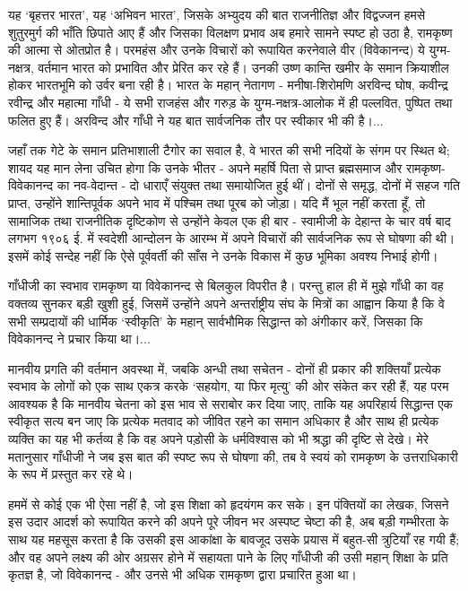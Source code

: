 यह ‘बृहत्तर भारत’, यह ‘अभिवन भारत’, जिसके अभ्युदय की बात राजनीतिज्ञ और विद्वज्जन हमसे शुतुरमुर्ग की भाँति छिपाते आए हैं और जिसका विलक्षण प्रभाव अब हमारे सामने स्पष्ट हो उठा है, रामकृष्ण की आत्मा से ओतप्रोत है। परमहंस और उनके विचारों को रूपायित करनेवाले वीर (विवेकानन्द) ये युग्म-नक्षत्र, वर्तमान भारत को प्रभावित और प्रेरित कर रहे हैं। उनकी उष्ण कान्ति खमीर के समान क्रियाशील होकर भारतभूमि को उर्वर बना रही है। भारत के महान् नेतागण - मनीषा-शिरोमणि अरविन्द घोष, कवीन्द्र रवीन्द्र और महात्मा गाँधी - ये सभी राजहंस और गरुड़ के युग्म-नक्षत्र-आलोक में ही पल्लवित, पुष्पित तथा फलित हुए हैं। अरविन्द और गाँधी ने यह बात सार्वजनिक तौर पर स्वीकार भी की है।... 

जहाँ तक गेटे के समान प्रतिभाशाली टैगोर का सवाल है, वे भारत की सभी नदियों के संगम पर स्थित थे; शायद यह मान लेना उचित होगा कि उनके भीतर - अपने महर्षि पिता से प्राप्त ब्रह्मसमाज और रामकृष्ण-विवेकानन्द का नव-वेदान्त - दो धाराएँ संयुक्त तथा समायोजित हुई थीं। दोनों से समृद्ध, दोनों में सहज गति प्राप्त, उन्होंने शान्तिपूर्वक अपने भाव में पश्चिम तथा पूरब को जोड़ा। यदि मैं भूल नहीं करता हूँ, तो सामाजिक तथा राजनीतिक दृष्टिकोण से उन्होंने केवल एक ही बार - स्वामीजी के देहान्त के चार वर्ष बाद लगभग १९०६ ई. में स्वदेशी आन्दोलन के आरम्भ में अपने विचारों की सार्वजनिक रूप से घोषणा की थी। इसमें कोई सन्देह नहीं कि ऐसे पूर्ववर्ती की साँस ने उनके विकास में कुछ भूमिका अवश्य निभाई होगी। 

\delimiter

गाँधीजी का स्वभाव रामकृष्ण या विवेकानन्द से बिलकुल विपरीत है। परन्तु हाल ही में मुझे गाँधी का वह वक्तव्य सुनकर बड़ी खुशी हुई, जिसमें उन्होंने अपने अन्तर्राष्ट्रीय संघ के मित्रों का आह्वान किया है कि वे सभी सम्प्रदायों की धार्मिक ‘स्वीकृति’ के महान् सार्वभौमिक सिद्धान्त को अंगीकार करें, जिसका कि विवेकानन्द ने प्रचार किया था।... 

मानवीय प्रगति की वर्तमान अवस्था में, जबकि अन्धी तथा सचेतन - दोनों ही प्रकार की शक्तियाँ प्रत्येक स्वभाव के लोगों को एक साथ एकत्र करके ‘सहयोग, या फिर मृत्यु’ की ओर संकेत कर रही हैं, यह परम आवश्यक है कि मानवीय चेतना को इस भाव से सराबोर कर दिया जाए, ताकि यह अपरिहार्य सिद्धान्त एक स्वीकृत सत्य बन जाए कि प्रत्येक मतवाद को जीवित रहने का समान अधिकार है और साथ ही प्रत्येक व्यक्ति का यह भी कर्तव्य है कि वह अपने पड़ोसी के धर्मविश्वास को भी श्रद्धा की दृष्टि से देखे। मेरे मतानुसार गाँधीजी ने जब इस बात की स्पष्ट रूप से घोषणा की, तब वे स्वयं को रामकृष्ण के उत्तराधिकारी के रूप में प्रस्तुत कर रहे थे। 

हममें से कोई एक भी ऐसा नहीं है, जो इस शिक्षा को हृदयंगम कर सके। इन पंक्तियों का लेखक, जिसने इस उदार आदर्श को रूपायित करने की अपने पूरे जीवन भर अस्पष्ट चेष्टा की है, अब बड़ी गम्भीरता के साथ यह महसूस करता है कि उसकी इस आकांक्षा के बावजूद उसके प्रयास में बहुत-सी त्रुटियाँ रह गयी हैं; और वह अपने लक्ष्य की ओर अग्रसर होने में सहायता पाने के लिए गाँधीजी की उसी महान् शिक्षा के प्रति कृतज्ञ है, जो विवेकानन्द - और उनसे भी अधिक रामकृष्ण द्वारा प्रचारित हुआ था।


